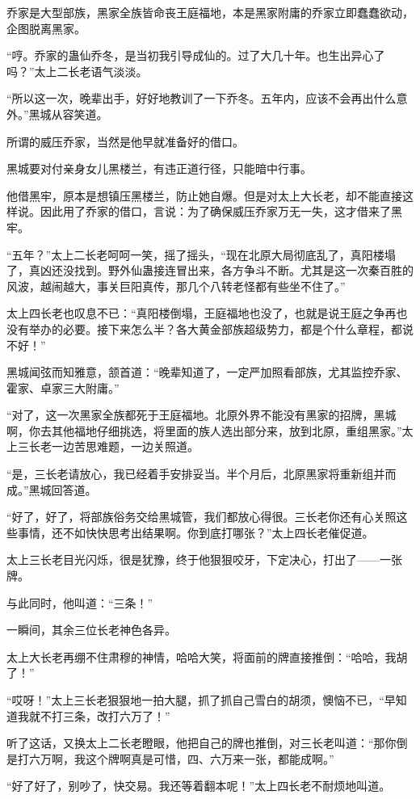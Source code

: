 \begin{this_body}
乔家是大型部族，黑家全族皆命丧王庭福地，本是黑家附庸的乔家立即蠢蠢欲动，企图脱离黑家。

“哼。乔家的蛊仙乔冬，是当初我引导成仙的。过了大几十年。也生出异心了吗？”太上二长老语气淡淡。

“所以这一次，晚辈出手，好好地教训了一下乔冬。五年内，应该不会再出什么意外。”黑城从容笑道。

所谓的威压乔家，当然是他早就准备好的借口。

黑城要对付亲身女儿黑楼兰，有违正道行径，只能暗中行事。

他借黑牢，原本是想镇压黑楼兰，防止她自爆。但是对太上大长老，却不能直接这样说。因此用了乔家的借口，言说：为了确保威压乔家万无一失，这才借来了黑牢。

“五年？”太上二长老呵呵一笑，摇了摇头，“现在北原大局彻底乱了，真阳楼塌了，真凶还没找到。野外仙蛊接连冒出来，各方争斗不断。尤其是这一次秦百胜的风波，越闹越大，事关巨阳真传，那几个八转老怪都有些坐不住了。”

太上四长老也叹息不已：“真阳楼倒塌，王庭福地也没了，也就是说王庭之争再也没有举办的必要。接下来怎么半？各大黄金部族超级势力，都是个什么章程，都说不好！”

黑城闻弦而知雅意，颔首道：“晚辈知道了，一定严加照看部族，尤其监控乔家、霍家、卓家三大附庸。”

“对了，这一次黑家全族都死于王庭福地。北原外界不能没有黑家的招牌，黑城啊，你去其他福地仔细挑选，将里面的族人选出部分来，放到北原，重组黑家。”太上三长老一边苦思难题，一边关照道。

“是，三长老请放心，我已经着手安排妥当。半个月后，北原黑家将重新组并而成。”黑城回答道。

“好了，好了，将部族俗务交给黑城管，我们都放心得很。三长老你还有心关照这些事情，还不如快快思考出结果啊。你到底打哪张？”太上四长老催促道。

太上三长老目光闪烁，很是犹豫，终于他狠狠咬牙，下定决心，打出了——一张牌。

与此同时，他叫道：“三条！”

一瞬间，其余三位长老神色各异。

太上大长老再绷不住肃穆的神情，哈哈大笑，将面前的牌直接推倒：“哈哈，我胡了！”

“哎呀！”太上三长老狠狠地一拍大腿，抓了抓自己雪白的胡须，懊恼不已，“早知道我就不打三条，改打六万了！”

听了这话，又换太上二长老瞪眼，他把自己的牌也推倒，对三长老叫道：“那你倒是打六万啊，我这个牌啊真是可惜，四、六万来一张，都能成啊。”

“好了好了，别吵了，快交易。我还等着翻本呢！”太上四长老不耐烦地叫道。


\end{this_body}
